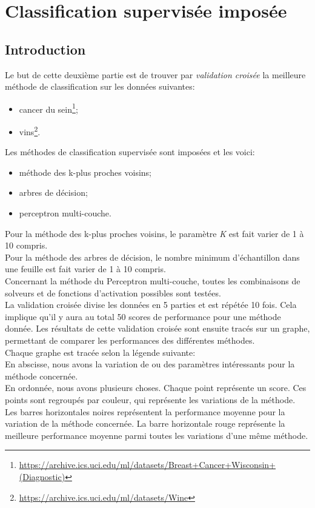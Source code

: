 \documentclass[11pt, a4paper]{article}
\begin{document}
\section{Classification supervisée imposée}
\subsection{Introduction}
\label{part2}

Le but de cette deuxième partie est de trouver par \textit{validation croisée}
la meilleure méthode de classification sur les données suivantes:
\begin{itemize}
    \item cancer du sein\footnote{\url{https://archive.ics.uci.edu/ml/datasets/Breast+Cancer+Wisconsin+(Diagnostic)}};
    \item vins\footnote{\url{https://archive.ics.uci.edu/ml/datasets/Wine}}. \\
\end{itemize}

Les méthodes de classification supervisée sont imposées et les voici:
\begin{itemize}
    \item méthode des k-plus proches voisins;
    \item arbres de décision;
    \item perceptron multi-couche. \\
\end{itemize}

Pour la méthode des k-plus proches voisins, le paramètre \textit{K} est fait varier de 1 à 10 compris. \\
Pour la méthode des arbres de décision,
le nombre minimum d'échantillon dans une feuille est fait varier de 1 à 10 compris. \\
Concernant la méthode du Perceptron multi-couche,
toutes les combinaisons de solveurs et de fonctions d'activation possibles sont testées. \\

La validation croisée divise les données en 5 parties et est répétée 10 fois.
Cela implique qu'il y aura au total 50 scores de performance pour une méthode donnée.
Les résultats de cette validation croisée sont ensuite tracés sur un graphe,
permettant de comparer les performances des différentes méthodes. \\

Chaque graphe est tracée selon la légende suivante: \\
En abscisse, nous avons la variation de ou des paramètres intéressants pour la méthode concernée. \\
En ordonnée, nous avons plusieurs choses.
Chaque point représente un score.
Ces points sont regroupés par couleur, qui représente les variations de la méthode.
Les barres horizontales noires représentent la performance moyenne pour la variation de la méthode concernée.
La barre horizontale rouge représente la meilleure performance moyenne parmi toutes les variations d'une même méthode.
\end{document}
